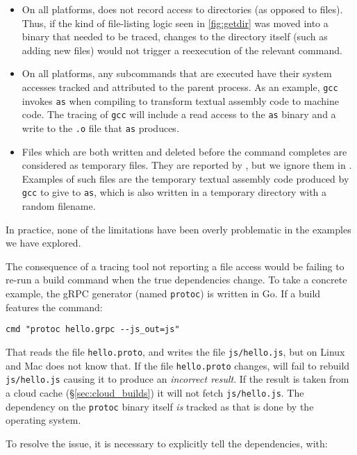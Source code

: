\begin{itemize}
\item On all platforms, \Fsatrace does not record access to directories (as opposed to files). Thus, if the kind of file-listing logic seen in \ref{fig:getdir} was moved into a binary that needed to be traced, changes to the directory itself (such as adding new files) would not trigger a reexecution of the relevant command.
\item On all platforms, any subcommands that are executed have their system accesses tracked and attributed to the parent process. As an example, \texttt{gcc} invokes \texttt{as} when compiling to transform textual assembly code to machine code. The tracing of \texttt{gcc} will include a read access to the \texttt{as} binary and a write to the \texttt{.o} file that \texttt{as} produces.
\item Files which are both written and deleted before the command completes are considered as temporary files. They are reported by \Fsatrace, but we ignore them in \Rattle. Examples of such files are the temporary textual assembly code produced by \texttt{gcc} to give to \texttt{as}, which is also written in a temporary directory with a random filename.
\end{itemize}

\noindent In practice, none of the limitations have been overly problematic in the examples we have explored.

The consequence of a tracing tool not reporting a file access would be failing to re-run a build command when the true dependencies change. To take a concrete example, the gRPC generator (named \texttt{protoc}) is written in Go. If a \Rattle build features the command:

\begin{verbatim}
cmd "protoc hello.grpc --js_out=js"
\end{verbatim}

That reads the file \texttt{hello.proto}, and writes the file \texttt{js/hello.js}, but on Linux and Mac \Rattle does not know that. If the file \texttt{hello.proto} changes, \Rattle will fail to rebuild \texttt{js/hello.js} causing it to produce an \emph{incorrect result}. If the result is taken from a cloud cache (\S\ref{sec:cloud_builds}) it will not fetch \texttt{js/hello.js}. The dependency on the \texttt{protoc} binary itself \emph{is} tracked as that is done by the operating system.

To resolve the issue, it is necessary to explicitly tell \Rattle the dependencies, with:

